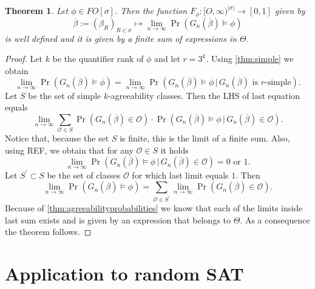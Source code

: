 \documentclass[12pt,notitlepage,a4paper]{article}
\newtheorem{theorem}{Theorem}[section]
\newtheorem{lemma}{Lemma}[section]
\theoremstyle{definition}
\newcommand{\N}{\mathbb{N}}
\newcommand{\Ln}{\lim\limits_{n\to \infty}}
\begin{document}
\begin{theorem}
	Let $\phi\in FO[\sigma]$. Then the function 
	$F_\phi: [O,\infty)^{|\sigma|}\rightarrow [0,1]$
	given by
	\[
	\overline{\beta}:=(\beta_R)_{R\in \sigma} \mapsto
	\Ln \Pr \left(
	G_n(\overline{\beta}) \models \phi
	\right)
	\]
	is well defined and it is given by a finite sum of expressions
	in $\Theta$.
\end{theorem}
\begin{proof}
	Let $k$ be the quantifier rank of $\phi$ and
	let $r=3^k$. Using \cref{thm:simple} we obtain
	\[
	\Ln \Pr \left(
	G_n(\overline{\beta}) \models \phi
	\right)=
	\Ln \Pr \left(
	G_n(\overline{\beta}) \models \phi
	\, \Big|
	\, G_n(\overline{\beta})
	\text{ is $r$-simple}
	\right).
	\]
	Let $S$ be the set of simple $k$-agreeability classes. 
	Then the LHS of last equation equals
	\[
	\Ln
	\sum_{\mathcal{O}\in S} \Pr\left(
	G_n(\overline{\beta})\in \mathcal{O}
	\right) \cdot 
	\Pr\left(
	G_n(\overline{\beta})\models \phi \,
	\Big| \,
	G_n(\overline{\beta})\in \mathcal{O}
	\right).
	\]
	Notice that, because the set $S$ is finite, 
	this is the limit of a finite sum. Also, 
	using REF, we obtain that for any $\mathcal{O}\in S$
	it holds
	\[
	\Ln \Pr\left(
	G_n(\overline{\beta})\models \phi \,
	\Big| \,
	G_n(\overline{\beta})\in \mathcal{O}
	\right) = 0 \textrm{ or } 1.
	\]
	Let $S^\prime\subset S$ be the set of classes 
	$\mathcal{O}$ for which last limit equals $1$. Then
	\[
	\Ln \Pr \left(
	G_n(\overline{\beta}) \models \phi
	\right)=
	\sum_{\mathcal{O}\in S^\prime}
	\Ln \Pr\left(
	G_n(\overline{\beta})\in \mathcal{O}
	\right).		
	\]
	Because of \cref{thm:agreeabilityprobabilities} we know that
	each of the limits inside last sum exists and is given by
	an expression that belongs to $\Theta$. As a consequence the
	theorem follows. 	
\end{proof}

\section{Application to random SAT}





%
%
%	


\end{document}

